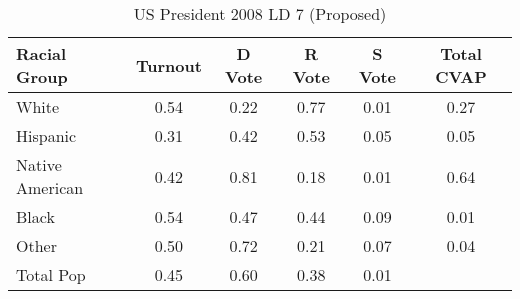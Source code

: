 \begin{table}[htb]
\begin{center}
\caption{US President 2008 LD 7 (Proposed)}
\label{pres08_cvap_ld_7}
\begin{tabular}{lccccc}
  \hline
Racial Group & Turnout & D Vote & R Vote & S Vote & Total CVAP \\ 
  \hline
White & 0.54 & 0.22 & 0.77 & 0.01 & 0.27 \\ 
  Hispanic & 0.31 & 0.42 & 0.53 & 0.05 & 0.05 \\ 
  Native American & 0.42 & 0.81 & 0.18 & 0.01 & 0.64 \\ 
  Black & 0.54 & 0.47 & 0.44 & 0.09 & 0.01 \\ 
  Other & 0.50 & 0.72 & 0.21 & 0.07 & 0.04 \\ 
  Total Pop & 0.45 & 0.60 & 0.38 & 0.01 &  \\ 
   \hline
\end{tabular}
\end{center}
\end{table}
